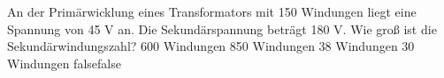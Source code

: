     {An der Primärwicklung eines Transformators mit 150 Windungen liegt eine Spannung von 45 V an. Die Sekundärspannung beträgt 180 V. Wie groß ist die Sekundärwindungszahl?}
    {600 Windungen}
    {850 Windungen}
    {38 Windungen}
    {30 Windungen}
    {false}{false}